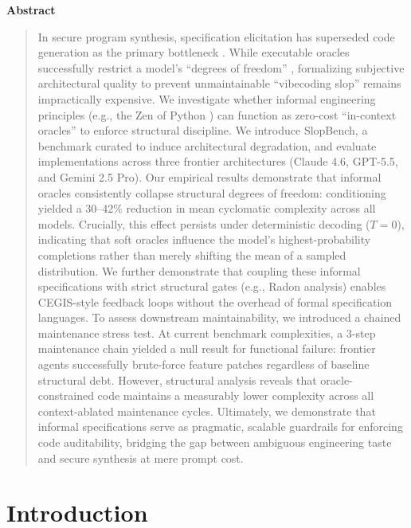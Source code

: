 \documentclass[11pt]{article}
\begin{document}
\begin{center}
{\large\bfseries Abstract}
\end{center}
\vspace{0.12in}
\begin{quote}
In secure program synthesis, specification elicitation has superseded code generation as the primary bottleneck \cite{Dodds2025Specs, QuinnHippel2026Proofs}. While executable oracles successfully restrict a model's ``degrees of freedom'' \cite{Regehr2026ZeroDOF}, formalizing subjective architectural quality to prevent unmaintainable ``vibecoding slop'' remains impractically expensive. We investigate whether informal engineering principles (e.g., the Zen of Python \cite{Peters2004Zen}) can function as zero-cost ``in-context oracles'' to enforce structural discipline. We introduce SlopBench, a benchmark curated to induce architectural degradation, and evaluate implementations across three frontier architectures (Claude 4.6, GPT-5.5, and Gemini 2.5 Pro). Our empirical results demonstrate that informal oracles consistently collapse structural degrees of freedom: conditioning yielded a 30--42\% reduction in mean cyclomatic complexity across all models. Crucially, this effect persists under deterministic decoding ($T=0$), indicating that soft oracles influence the model's highest-probability completions rather than merely shifting the mean of a sampled distribution. We further demonstrate that coupling these informal specifications with strict structural gates (e.g., Radon analysis) enables CEGIS-style feedback loops without the overhead of formal specification languages. To assess downstream maintainability, we introduced a chained maintenance stress test. At current benchmark complexities, a 3-step maintenance chain yielded a null result for functional failure: frontier agents successfully brute-force feature patches regardless of baseline structural debt. However, structural analysis reveals that oracle-constrained code maintains a measurably lower complexity across all context-ablated maintenance cycles. Ultimately, we demonstrate that informal specifications serve as pragmatic, scalable guardrails for enforcing code auditability, bridging the gap between ambiguous engineering taste and secure synthesis at mere prompt cost.
\end{quote}

\vspace{0.25in}

\section{Introduction}
\end{document}
